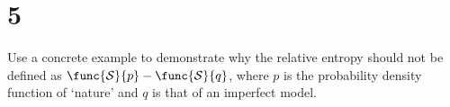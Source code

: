 \section{5}

Use a concrete example to demonstrate why the relative entropy should not be defined as $\func{\mathcal{S}}{p} - \func{\mathcal{S}}{q}$, where $p$ is the probability density function of `nature' and $q$ is that of an imperfect model.

